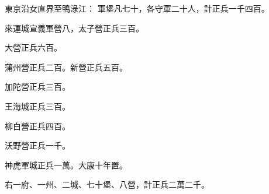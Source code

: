 \begin{pinyinscope}
 東京沿女直界至鴨淥江：
 軍堡凡七十，各守軍二十人，計正兵一千四百。



 來運城宣義軍營八，太子營正兵三百。



 大營正兵六百。



 蒲州營正兵二百。新營正兵五百。



 加陀營正兵三百。



 王海城正兵三百。



 柳白營正兵四百。



 沃野營正兵一千。



 神虎軍城正兵一萬。大康十年置。



 右一府、一州、二城、七十堡、八營，計正兵二萬二千。



\end{pinyinscope}